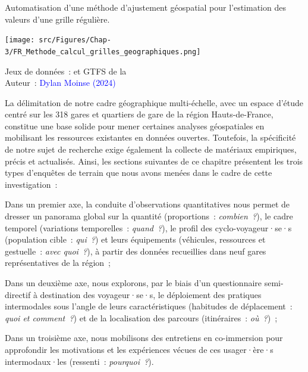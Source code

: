 \begin{refsegment}
    \begin{carte}[h!]\vspace*{4pt}
        \caption{Automatisation d'une méthode d'ajustement géospatial pour l'estimation des valeurs d'une grille régulière.}
        \label{fig-chap3:methode-calcul-grilles-geographiques}
        \centerline{\texttt{[image: src/Figures/Chap-3/FR\_Methode\_calcul\_grilles\_geographiques.png]}}
        \vspace{5pt}
        \begin{flushright}\scriptsize{
        Jeux de données~: \textcolor{blue}{\textcite{openstreetmap_openstreetmap_2023}} et \acrshort{GTFS} de la \textcolor{blue}{\textcite{sncf_reseau_2024}}
        \\
        Auteur~: \textcolor{blue}{Dylan Moinse (2024)}
        }\end{flushright}
    \end{carte}

La délimitation de notre cadre géographique multi-échelle, avec un espace d'étude centré sur les 318 gares et quartiers de gare de la région Hauts-de-France, constitue une base solide pour mener certaines analyses géospatiales en mobilisant les ressources existantes en données ouvertes. Toutefois, la spécificité de notre sujet de recherche exige également la collecte de matériaux empiriques, précis et actualisés. Ainsi, les sections suivantes de ce chapitre présentent les trois types d’enquêtes de terrain que nous avons menées dans le cadre de cette investigation~:
    \begin{customitemize}
\item Dans un premier axe, la conduite d'observations quantitatives nous permet de dresser un panorama global sur la quantité (proportions~: \textsl{combien~?}), le cadre temporel (variations temporelles~: \textsl{quand~?}), le profil des cyclo-voyageur·se·s (population cible~: \textsl{qui~?}) et leurs équipements (véhicules, ressources et gestuelle~: \textsl{avec quoi~?}), à partir des données recueillies dans neuf gares représentatives de la région~;
\item Dans un deuxième axe, nous explorons, par le biais d'un questionnaire semi-directif à destination des voyageur·se·s, le déploiement des pratiques intermodales sous l’angle de leurs caractéristiques (habitudes de déplacement~: \textsl{quoi et comment~?}) et de la localisation des parcours (itinéraires~: \textsl{où~?})~;
\item Dans un troisième axe, nous mobilisons des entretiens en co-immersion pour approfondir les motivations et les expériences vécues de ces usager·ère·s intermodaux·les (ressenti~: \textsl{pourquoi~?}).
    \end{customitemize}%


\end{refsegment}
